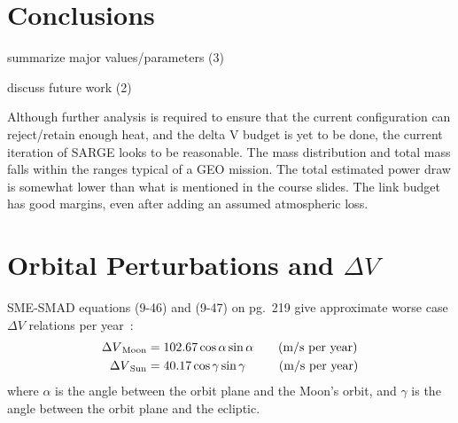 \documentclass[9pt]{article}
\begin{document}
\section{Conclusions}
summarize major values/parameters (3)

discuss future work (2)

Although further analysis is required to ensure that the current configuration can reject/retain enough heat, and the delta V budget is yet to be done, the current iteration of SARGE looks to be reasonable.
The mass distribution and total mass falls within the ranges typical of a GEO mission.
The total estimated power draw is somewhat lower than what is mentioned in the course slides.
The link budget has good margins, even after adding an assumed atmospheric loss.



\clearpage
\appendix

\printbibliography
\clearpage
\section{Orbital Perturbations and $\Delta V$}\label{app:orbpert}

SME-SMAD equations (9-46) and (9-47) on pg.~219 give approximate worse case $\Delta V$ relations per year~\cite{sme}:
\begin{align}
  {\Delta V}_\text{Moon} &= 102.67\cos\alpha\sin\alpha\hspace{2em}\text{(m/s per year)}\\
  {\Delta V}_\text{Sun} &= 40.17\cos\gamma\sin\gamma\hspace{2.7em}\text{(m/s per year)}
\end{align}
where $\alpha$ is the angle between the orbit plane and the Moon's orbit, and $\gamma$ is the angle between the orbit plane and the ecliptic.
\end{document}
